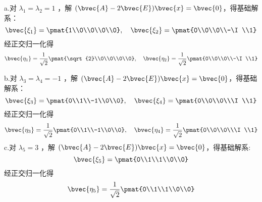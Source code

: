 a.对 $\lambda_1=\lambda_2=1$ ，解 $(\bvec{A}-2\bvec{E})\bvec{x}=\bvec{0}$，得基础解系：
\begin{equation}
\bvec{\xi_1}=\pmat{1\\0\\0\\0\\0},\quad
\bvec{\xi_2}=\pmat{0\\0\\0\\-\I\\1}
\end{equation}
经正交归一化得
\begin{equation}
\bvec{\eta_1}=\frac{1}{\sqrt{2}}\pmat{\sqrt{2}\\0\\0\\0\\0},\quad
\bvec{\eta_2}=\frac{1}{\sqrt{2}}\pmat{0\\0\\0\\-\I\\1}
\end{equation}

b.对 $\lambda_3=\lambda_4=-1$ ，解 $(\bvec{A}-2\bvec{E})\bvec{x}=\bvec{0}$，得基础解系：
\begin{equation}
\bvec{\xi_3}=\pmat{0\\1\\-1\\0\\0},\quad
\bvec{\xi_4}=\pmat{0\\0\\0\\\I\\1}
\end{equation}
经正交归一化得
\begin{equation}
\bvec{\eta_3}=\frac{1}{\sqrt{2}}\pmat{0\\1\\-1\\0\\0},\quad
\bvec{\eta_4}=\frac{1}{\sqrt{2}}\pmat{0\\0\\0\\\I\\1}
\end{equation}
c.对 $\lambda_5=3$ ，解 $(\bvec{A}-2\bvec{E})\bvec{x}=\bvec{0}$，得基础解系:
\begin{equation}
\bvec{\xi_5}=\pmat{0\\1\\1\\0\\0}
\end{equation}
经正交归一化得
\begin{equation}
\bvec{\eta_5}=\frac{1}{\sqrt{2}}\pmat{0\\1\\1\\0\\0}
\end{equation}

